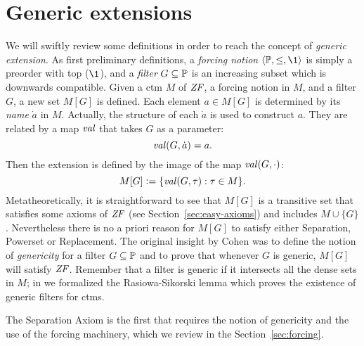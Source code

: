 \section{Generic extensions}
\label{sec:generic-extensions}
We will swiftly review some definitions in order to reach the concept
of \emph{generic extension}. As first preliminary definitions, a \emph{forcing
notion} $\lb\PP,\leq,\1\rb$ is simply a preorder with top ($\1$), and a \emph{filter}
$G\subseteq\mathbb{P}$ is an increasing subset which is downwards
compatible. Given a ctm $M$ of $\mathit{ZF}$, a forcing
notion in $M$, and a filter $G$, a new set $M[G]$ is defined. Each
element $a\in M[G]$ is 
determined by its \emph{name} $\dot a$ in $M$. Actually, the structure of
each $\dot a$ is used to construct $a$. They are related by a
map $\operatorname{\mathit{val}}$ that takes $G$ as a parameter:
\[
\operatorname{\mathit{val}}(G,\dot a) = a.
\] 
Then the extension is defined by the image of the map $\operatorname{\mathit{val}}(G,\cdot)$:
\[
M[G] \mathrel{\mathop:}= \{\operatorname{\mathit{val}}(G,\tau): \tau\in M\}.
\]
Metatheoretically, it is straightforward to see that $M[G]$ is a
transitive set that satisfies some axioms of $\mathit{ZF}$ (see
Section~\ref{sec:easy-axioms}) and includes $M\cup\{G\}$. Nevertheless
there is no a priori reason for $M[G]$ to satisfy either Separation, Powerset
or Replacement. The original insight by Cohen was to define the notion
of \emph{genericity} for a filter $G\subseteq\mathbb{P}$ and to prove that
whenever $G$ is generic, $M[G]$ will satisfy $\mathit{ZF}$. Remember that a
filter is generic if it intersects all the dense sets in $M$; in
\cite{2018arXiv180705174G} we formalized the Rasiowa-Sikorski lemma which
proves the existence of generic filters for ctms.

The Separation Axiom  is the first that requires the notion of
genericity and the use of the forcing machinery, which we review in
the Section~\ref{sec:forcing}.

